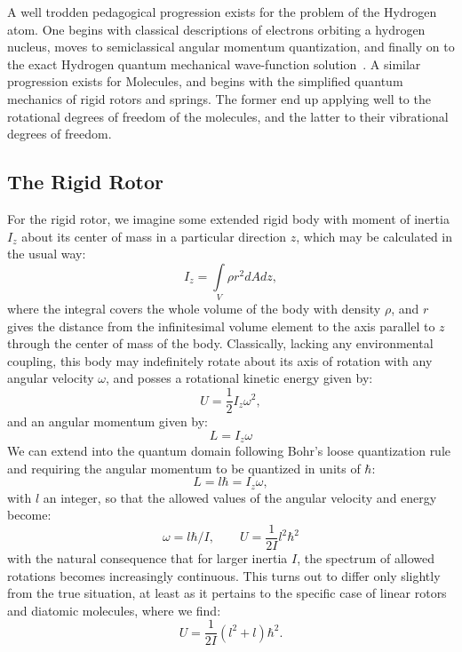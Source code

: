 A well trodden pedagogical progression exists for the problem of the Hydrogen atom. 
One begins with classical descriptions of electrons orbiting a hydrogen nucleus, moves to semiclassical angular momentum quantization, and finally on to the exact Hydrogen quantum mechanical wave-function solution~\citep[Sec.~4.2]{Griffiths2018}. 
A similar progression exists for Molecules, and begins with the simplified quantum mechanics of rigid rotors and springs.
The former end up applying well to the rotational degrees of freedom of the molecules, and the latter to their vibrational degrees of freedom.

\subsection{The Rigid Rotor}

For the rigid rotor, we imagine some extended rigid body with moment of inertia $I_z$ about its center of mass in a particular direction $z$, which may be calculated in the usual way:
\begin{equation}
I_z = \int\limits_V\rho r^2 dAdz,\label{izsimp}
\end{equation}
where the integral covers the whole volume of the body with density $\rho$, and $r$ gives the distance from the infinitesimal volume element to the axis parallel to $z$ through the center of mass of the body.
Classically, lacking any environmental coupling, this body may indefinitely rotate about its axis of rotation with any angular velocity $\omega$, and posses a rotational kinetic energy given by:
\begin{equation}
U=\frac{1}{2}I_z\omega^2,
\end{equation}
and an angular momentum given by:
\begin{equation}
L= I_z\omega
\end{equation}
We can extend into the quantum domain following Bohr's loose quantization rule and requiring the angular momentum to be quantized in units of $\hbar$:
\begin{equation}
L = l\hbar = I_z\omega,
\end{equation}
with $l$ an integer, so that the allowed values of the angular velocity and energy become:
\begin{equation}
\omega = l\hbar/I, \qquad U = \frac{1}{2I}l^2\hbar^2
\end{equation}
with the natural consequence that for larger inertia $I$, the spectrum of allowed rotations becomes increasingly continuous.
This turns out to differ only slightly from the true situation, at least as it pertains to the specific case of linear rotors and diatomic molecules, where we find:
\begin{equation}
U = \frac{1}{2I}(l^2 + l)\hbar^2.
\end{equation}

